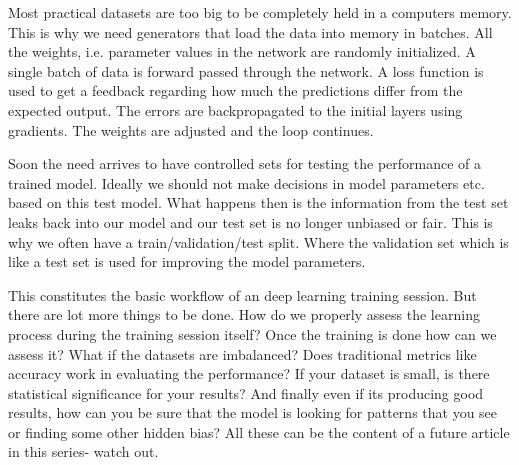 \documentclass{../template/texnote}
\begin{document}
Most practical datasets are too big to be completely held in a computers memory. This is why we need generators that load the data into memory in batches. 
All the weights, i.e. parameter values in the network are randomly initialized. A single batch of data is forward passed through the network. A loss function is used to get a feedback regarding how much the predictions differ from the expected output. The errors are backpropagated to the initial layers using gradients. The weights are adjusted and the loop continues. 

Soon the need arrives to have controlled sets for testing the performance of a trained model. Ideally we should not make decisions in model parameters etc. based on this test model. What happens then is the information from the test set leaks back into our model and our test set is no longer unbiased or fair. This is why we often have a train/validation/test split. Where the validation set which is like a test set is used for improving the model parameters.

This constitutes the basic workflow of an deep learning training session. But there are lot more things to be done. How do we properly assess the learning process during the training session itself? Once the training is done how can we assess it? What if the datasets are imbalanced? Does traditional metrics like accuracy work in evaluating the performance? If your dataset is small, is there statistical significance for your results? And finally even if its producing good results, how can you be sure that the model is looking for patterns that you see or finding some other hidden bias? All these can be the content of a future article in this series- watch out. 
\vspace{0.5cm}

\noindent{}
    \printbibliography
\end{document}

